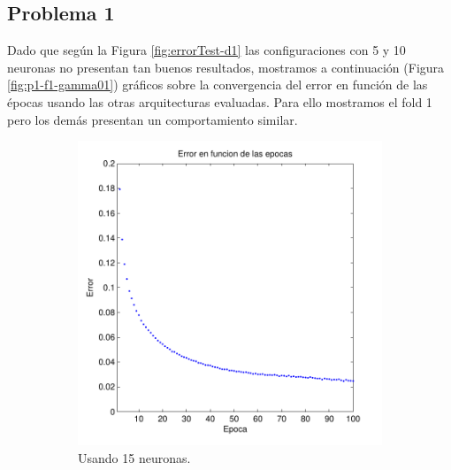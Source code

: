 \documentclass[informe.tex]{subfiles}
\begin{document}
    
    \subsection{Problema 1}
      
      Dado que según la Figura \ref{fig:errorTest-d1} las configuraciones con 5 y 10 neuronas no presentan tan buenos resultados, mostramos a continuación (Figura \ref{fig:p1-f1-gamma01}) gráficos sobre la convergencia del error en función de las épocas usando las otras arquitecturas evaluadas. Para ello mostramos el fold 1 pero los demás presentan un comportamiento similar.
      
      \begin{figure}[H]
        \centering
        \begin{subfigure}[b]{0.32\textwidth}
                \includegraphics[width=\textwidth]{graficos/error_fold1_15_binary_100_01.pdf}
                \caption{Usando 15 neuronas.}
                \label{fig:d1-f1-01-n15}
        \end{subfigure}
        \begin{subfigure}[b]{0.32\textwidth}

\end{subfigure}
\end{figure}
\end{document}
